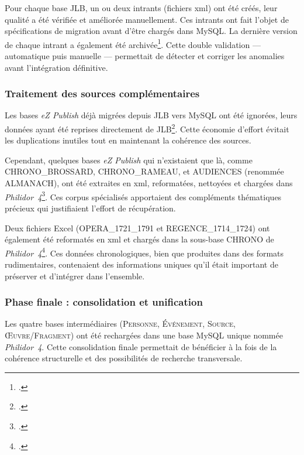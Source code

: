 Pour chaque base JLB, un ou deux intrants (fichiers \gls{xml}) ont été créés, leur qualité a été vérifiée et améliorée manuellement. Ces intrants ont fait l'objet de spécifications de migration avant d'être chargés dans MySQL. La dernière version de chaque intrant a également été archivée\footcite{laurentguilloRapportMigrationAnciennes2022}. Cette double validation — automatique puis manuelle — permettait de détecter et corriger les anomalies avant l'intégration définitive.

\subsubsection{Traitement des sources complémentaires}

Les bases \textit{eZ Publish} déjà migrées depuis JLB vers MySQL ont été ignorées, leurs données ayant été reprises directement de JLB\footcite{laurentguilloRapportMigrationAnciennes2022}. Cette économie d'effort évitait les duplications inutiles tout en maintenant la cohérence des sources.

Cependant, quelques bases \textit{eZ Publish} qui n'existaient que là, comme CHRONO\_BROSSARD, CHRONO\_RAMEAU, et AUDIENCES (renommée ALMANACH), ont été extraites en \gls{xml}, reformatées, nettoyées et chargées dans \textit{Philidor~4}\footcite{laurentguilloRapportMigrationAnciennes2022}. Ces corpus spécialisés apportaient des compléments thématiques précieux qui justifiaient l'effort de récupération.

Deux fichiers Excel (OPERA\_1721\_1791 et REGENCE\_1714\_1724) ont également été reformatés en \gls{xml} et chargés dans la sous-base CHRONO de \textit{Philidor~4}\footcite{laurentguilloRapportMigrationAnciennes2022}. Ces données chronologiques, bien que produites dans des formats rudimentaires, contenaient des informations uniques qu'il était important de préserver et d'intégrer dans l'ensemble.

\subsubsection{Phase finale : consolidation et unification}

Les quatre bases intermédiaires (\textsc{Personne}, \textsc{Événement}, \textsc{Source}, \textsc{Œuvre/Fragment}) ont été rechargées dans une base MySQL unique nommée \textit{Philidor~4}. Cette consolidation finale permettait de bénéficier à la fois de la cohérence structurelle et des possibilités de recherche transversale.

